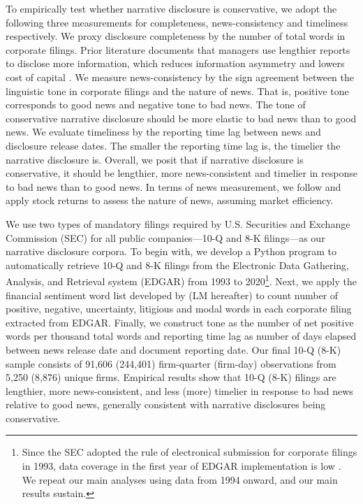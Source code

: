 \documentclass[a4paper]{article}
\begin{document}
\begin{spacing}{2}
To empirically test whether narrative disclosure is conservative, we adopt the following three measurements for completeness, news-consistency and timeliness respectively. We proxy disclosure completeness by the number of total words in corporate filings. Prior literature documents that managers use lengthier reports to disclose more information, which reduces information asymmetry and lowers cost of capital \citep*{leuzDisclosureCostCapital2009}. We measure news-consistency by the sign agreement between the linguistic tone in corporate filings and the nature of news. That is, positive tone corresponds to good news and negative tone to bad news. The tone of conservative narrative disclosure should be more elastic to bad news than to good news. We evaluate timeliness by the reporting time lag between news and disclosure release dates. The smaller the reporting time lag is, the timelier the narrative disclosure is. Overall, we posit that if narrative disclosure is conservative, it should be lengthier, more news-consistent and timelier in response to bad news than to good news. In terms of news measurement, we follow \citet{basuConservatismPrincipleAsymmetric1997} and apply stock returns to assess the nature of news, assuming market efficiency.

We use two types of mandatory filings required by U.S. Securities and Exchange Commission (SEC) for all public companies---10-Q and 8-K filings---as our narrative disclosure corpora. To begin with, we develop a Python program to automatically retrieve 10-Q and 8-K filings from the Electronic Data Gathering, Analysis, and Retrieval system (EDGAR) from 1993 to 2020\footnote{Since the SEC adopted the rule of electronical submission for corporate filings in 1993, data coverage in the first year of EDGAR implementation is low \citep*{gaoInformingMarketEffect2020}. We repeat our main analyses using data from 1994 onward, and our main results sustain.}. Next, we apply the financial sentiment word list developed by \citet*{loughranWhenLiabilityNot2011} (LM hereafter) to count number of positive, negative, uncertainty, litigious and modal words in each corporate filing extracted from EDGAR. Finally, we construct tone as the number of net positive words per thousand total words and reporting time lag as number of days elapsed between news release date and document reporting date. Our final 10-Q (8-K) sample consists of 91,606 (244,401) firm-quarter (firm-day) observations from 5,250 (8,876) unique firms. Empirical results show that 10-Q (8-K) filings are lengthier, more news-consistent, and less (more) timelier in response to bad news relative to good news, generally consistent with narrative disclosures being conservative. 


\end{spacing}
\end{document}
